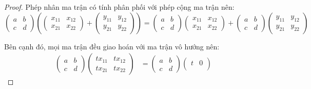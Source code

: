 \documentclass[class=linearalgebra,crop=false]{standalone}
\begin{document}
\begin{proof}
    Phép nhân ma trận có tính phân phối với phép cộng ma trận nên:
    \[
        \begin{pmatrix}
            a & b \\
            c & d
        \end{pmatrix}
        \left(
        \begin{pmatrix}
            x_{11} & x_{12} \\
            x_{21} & x_{22}
        \end{pmatrix}
        +
        \begin{pmatrix}
            y_{11} & y_{12} \\
            y_{21} & y_{22}
        \end{pmatrix}
        \right)
        =
        \begin{pmatrix}
            a & b \\
            c & d
        \end{pmatrix}
        \begin{pmatrix}
            x_{11} & x_{12} \\
            x_{21} & x_{22}
        \end{pmatrix}
        +
        \begin{pmatrix}
            a & b \\
            c & d
        \end{pmatrix}
        \begin{pmatrix}
            y_{11} & y_{12} \\
            y_{21} & y_{22}
        \end{pmatrix}
    \]
    \par Bên cạnh đó, mọi ma trận đều giao hoán với ma trận vô hướng nên:
    \begin{align*}
        \begin{pmatrix}
            a & b \\
            c & d
        \end{pmatrix}
        \begin{pmatrix}
            tx_{11} & tx_{12} \\
            tx_{21} & tx_{22}
        \end{pmatrix} & =
        \begin{pmatrix}
            a & b \\
            c & d
        \end{pmatrix}
        \begin{pmatrix}
            t & 0 \\

\end{pmatrix}
\end{align*}
\end{proof}
\end{document}
